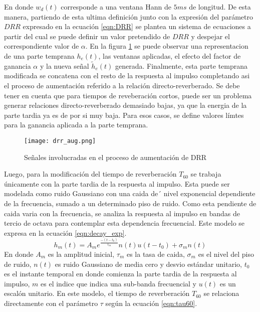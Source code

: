 En donde $w_{d}(t)$ corresponde a una ventana Hann de $5 ms$ de longitud. De esta manera, partiendo de esta ultima definición junto con la expresión del parámetro $DRR$ expresado en la ecuación \ref{eqn:DRR} se plantea un sistema de ecuaciones a partir del cual se puede definir un valor pretendido de $DRR$ y despejar el correspondiente valor de $\alpha$. En la figura \ref{fig:drr_aug} se puede observar una representacion de una parte temprana $h_{e}(t)$, las ventanas aplicadas, el efecto del factor de ganancia $\alpha$ y la nueva señal $\tilde{h}_{e}(t)$ generada. Finalmente, esta parte temprana modificada se concatena con el resto de la respuesta al impulso completando asi el proceso de aumentación referido a la relación directo-reverberado. Se debe tener en cuenta que para tiempos de reveberación cortos, puede ser un problema generar relaciones directo-reverberado demasiado bajas, ya que la energia de la parte tardia ya es de por si muy baja. Para esos casos, se define valores límtes para la ganancia aplicada a la parte temprana.

\begin{figure}[H]
	\centering{}
	\texttt{[image: drr\_aug.png]}
	\caption{Señales involucradas en el proceso de aumentación de DRR}
	\label{fig:drr_aug}
\end{figure}

Luego, para la modificación del tiempo de reverberación $T_{60}$ se trabaja únicamente con la parte tardia de la respuesta al impulso. Esta puede ser modelada como ruido Gaussiano con una caida de´ nivel exponencial dependiente de la frecuencia, sumado a un determinado piso de ruido. Como esta pendiente de caida varia con la frecuencia, se analiza la respuesta al impulso en bandas de tercio de octava para contemplar esta dependencia frecuencial. Este modelo se expresa en la ecuación \ref{eqn:decay_exp}. 
\begin{equation}
\label{eqn:decay_exp}
	h_{m}(t) = A_{m} e^{\frac{-(t-t_{0})}{\tau_{m}}}n(t)u(t-t_{0})+\sigma_{m}n(t)
\end{equation} 
En donde $A_{m}$ es la amplitud inicial, $\tau_{m}$ es la tasa de caida, $\sigma_{m}$ es el nivel del piso de ruido, $n(t)$ es ruido Gaussiano de media cero y desvio estándar unitario, $t_{0}$ es el instante temporal en donde comienza la parte tardia de la respuesta al impulso, $m$ es el indice que indica una sub-banda frecuencial y $u(t)$ es un escalón unitario. En este modelo, el tiempo de reverberación $T_{60}$ se relaciona directamente con el parámetro $\tau$ según la ecuación \ref{eqn:tau60}.

